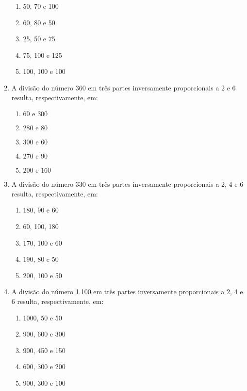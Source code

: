 \begin{multicols}{2}
\begin{enumerate}
\begin{enumerate}
\item 50, 70 e 100
\item 60, 80 e 50
\item 25, 50 e 75
\item 75, 100 e 125
\item 100, 100 e 100

\end{enumerate}
\item A divisão do número 360 em três partes inversamente proporcionais a 2 e 6 resulta, respectivamente,  em:
\begin{enumerate}

\item $60\mbox{ e }300$
\item $280\mbox{ e }80$
\item $300\mbox{ e }60$
\item $270\mbox{ e }90$
\item $200\mbox{ e }160$

\end{enumerate}
\item A divisão do número 330 em três partes inversamente proporcionais a 2, 4 e 6 resulta, respectivamente,  em:
\begin{enumerate}

\item 180, 90 e 60
\item 60, 100, 180
\item 170, 100 e 60
\item 190, 80 e 50
\item 200, 100 e 50

\end{enumerate}
\item A divisão do número 1.100 em três partes inversamente proporcionais a 2, 4 e 6 resulta, respectivamente,  em:
\begin{enumerate}

\item 1000, 50 e 50
\item 900, 600 e 300
\item 900, 450 e 150
\item 600, 300 e 200
\item 900, 300 e 100

\end{enumerate}
\end{enumerate}
\end{multicols}
